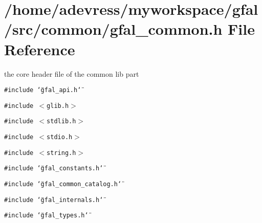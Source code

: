 \section{/home/adevress/myworkspace/gfal/src/common/gfal\_\-common.h File Reference}
\label{gfal__common_8h}
the core header file of the common lib part 

{\tt \#include \char`\"{}gfal\_\-api.h\char`\"{}}\par
{\tt \#include $<$glib.h$>$}\par
{\tt \#include $<$stdlib.h$>$}\par
{\tt \#include $<$stdio.h$>$}\par
{\tt \#include $<$string.h$>$}\par
{\tt \#include \char`\"{}gfal\_\-constants.h\char`\"{}}\par
{\tt \#include \char`\"{}gfal\_\-common\_\-catalog.h\char`\"{}}\par
{\tt \#include \char`\"{}gfal\_\-internals.h\char`\"{}}\par
{\tt \#include \char`\"{}gfal\_\-types.h\char`\"{}}\par
